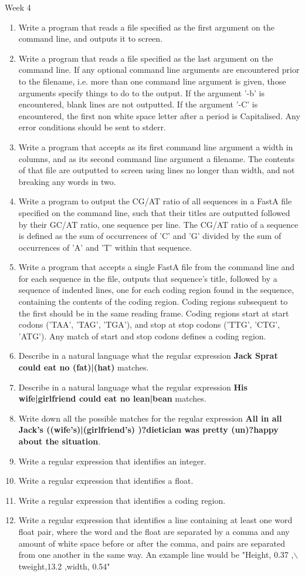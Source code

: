 \documentclass[a4paper,11pt]{article}
\begin{document}
\hypertarget{week4}{Week 4}
\begin{enumerate}
	\item Write a program that reads a file specified as the first argument on the command line, and outputs it to screen.
	\item Write a program that reads a file specified as the last argument on the command line. If any optional command line arguments are encountered prior to the filename, i.e. more than one command line argument is given, those    arguments specify things to do to the output. If the argument '-b' is encountered, blank lines are not outputted. If the argument '-C' is encountered, the first non white space letter after a period is Capitalised. Any error conditions should be    sent to stderr.
	\item Write a program that accepts as its first command line argument a width in columns, and as its second command line argument a filename. The contents of that file are outputted to screen using lines no longer than width, and not    breaking any words in two.
	\item Write a program to output the CG/AT ratio of all sequences in a FastA file specified on the command line, such that their titles are outputted followed by their GC/AT ratio, one sequence per line. The CG/AT ratio of a sequence    is defined as the sum of occurrences of 'C' and 'G' divided by the sum of occurrences of 'A' and 'T' within that sequence.
	\item Write a program that accepts a single FastA file from the command line and for each sequence in the file, outputs that sequence's title, followed by a sequence of indented lines, one for each coding region found in the sequence,    containing the contents of the coding region. Coding regions subsequent to the first should be in the same reading frame. Coding regions start at start codons ('TAA', 'TAG', 'TGA'), and stop at stop codons ('TTG', 'CTG', 'ATG'). Any match of start    and stop codons defines a coding region.
	\item Describe in a natural language what the regular expression \textbf{Jack Sprat could eat no (fat)|(hat)} matches.
	\item Describe in a natural language what the regular expression \textbf{His wife|girlfriend could eat no lean|bean} matches.
	\item Write down all the possible matches for the regular expression \textbf{All in all Jack's ((wife's)|(girlfriend's) )?dietician was pretty (un)?happy about the situation}.
	\item Write a regular expression that identifies an integer.
	\item Write a regular expression that identifies a float.
	\item Write a regular expression that identifies a coding region.
	\item Write a regular expression that identifies a line containing at least one word float pair, where the word and the float are separated by a comma and any amount of white space before or after the comma, and pairs are separated    from one another in the same way. An example line would be "Height, 0.37 ,$\backslash$tweight,13.2 ,width, 0.54"
\end{enumerate}
\end{document}
